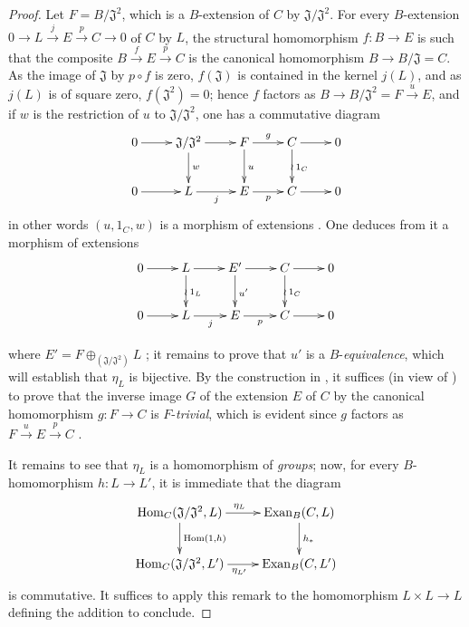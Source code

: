 \begin{proof}
Let $F=B/\mathfrak{J}^2$, which is a $B$-extension of $C$ by $\mathfrak{J}/\mathfrak{J}^2$.
For every $B$-extension
$0\to L\xrightarrow{j} E\xrightarrow{p} C\to 0$ of $C$ by $L$, the structural homomorphism $f:B\to E$ is such that the composite $B\xrightarrow{f} E\xrightarrow{p} C$ is the canonical homomorphism $B\to B/\mathfrak{J}=C$.
As the image of $\mathfrak{J}$ by $p\circ f$ is zero, $f(\mathfrak{J})$ is contained in the kernel $j(L)$, and as $j(L)$ is of square zero, $f(\mathfrak{J}^2)=0$; hence $f$ factors as $B\to B/\mathfrak{J}^2=F\xrightarrow{u} E$, and if $w$ is the restriction of $u$ to $\mathfrak{J}/\mathfrak{J}^2$, one has a commutative diagram
\[
  \xymatrix{
    0\ar[r] & \mathfrak{J}/\mathfrak{J}^2\ar[r]\ar[d]^w & F\ar[r]^g\ar[d]^u & C\ar[r]\ar[d]^{1_C}\ar@{}[d]|{\wr} & 0\\
    0\ar[r] & L\ar[r]_j & E\ar[r]_p & C\ar[r] & 0
  }
\]
in other words $(u,1_C,w)$ is a morphism of extensions .
One deduces from it a morphism of extensions
\[
  \xymatrix{
    0\ar[r] & L\ar[r]\ar[d]^{1_L}\ar@{}[d]|{\wr} & E'\ar[r]\ar[d]^{u'} & C\ar[r]\ar[d]^{1_C}\ar@{}[d]|{\wr} & 0\\
    0\ar[r] & L\ar[r]_j & E\ar[r]_p & C\ar[r] & 0
  }
\]


where $E'=F\oplus_{(\mathfrak J/\mathfrak J^2)}L$ ; it remains to prove that $u'$ is a $B$-\emph{equivalence}, which will establish that $\eta_L$ is bijective.
By the construction in , it suffices (in view of ) to prove that the inverse image $G$ of the extension $E$ of $C$ by the canonical homomorphism $g:F\to C$ is $F$-\emph{trivial}, which is evident since $g$ factors as $F\xrightarrow{u} E\xrightarrow{p} C$ .

It remains to see that $\eta_L$ is a homomorphism of \emph{groups}; now, for every $B$-homomorphism $h:L\to L'$, it is immediate that the diagram
\[
  \xymatrix{
    \operatorname{Hom}_C(\mathfrak{J}/\mathfrak{J}^2,L)\ar[r]^{\eta_L}\ar[d]^{\operatorname{Hom}(1,h)} & \operatorname{Exan}_B(C,L)\ar[d]^{h_*}\\
    \operatorname{Hom}_C(\mathfrak{J}/\mathfrak{J}^2,L')\ar[r]_{\eta_{L'}} & \operatorname{Exan}_B(C,L')
  }
\]
is commutative.
It suffices to apply this remark to the homomorphism $L\times L\to L$ defining the addition to conclude.
\end{proof}

